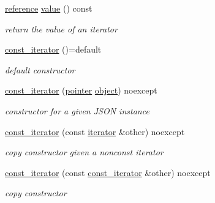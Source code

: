 \begin{DoxyCompactItemize}
\hyperlink{classnlohmann_1_1basic__json_1_1const__iterator_aefd248cac6493eed1e6ff53ba6a63eb2}{reference} \hyperlink{classnlohmann_1_1basic__json_1_1const__iterator_ac75e80d30b6169ee2a29ec93fb4d2acd}{value} () const 
\begin{DoxyCompactList}\small\item\em return the value of an iterator \end{DoxyCompactList}\item 
\hyperlink{classnlohmann_1_1basic__json_1_1const__iterator_ac6fdaff67857f82a623e5cc253917639}{const\-\_\-iterator} ()=default
\begin{DoxyCompactList}\small\item\em default constructor \end{DoxyCompactList}\item 
\hyperlink{classnlohmann_1_1basic__json_1_1const__iterator_a23de834b11bd895209aa65c100ab9ceb}{const\-\_\-iterator} (\hyperlink{classnlohmann_1_1basic__json_1_1const__iterator_a1da96fc3054d547e7706d3a2f073f389}{pointer} \hyperlink{classnlohmann_1_1basic__json_ad25b2f8c21e241e2d63455537a9294ff}{object}) noexcept
\begin{DoxyCompactList}\small\item\em constructor for a given J\-S\-O\-N instance \end{DoxyCompactList}\item 
\hyperlink{classnlohmann_1_1basic__json_1_1const__iterator_a6b950c6bc081ac1ec1540ec05ceb2603}{const\-\_\-iterator} (const \hyperlink{classnlohmann_1_1basic__json_1_1iterator}{iterator} \&other) noexcept
\begin{DoxyCompactList}\small\item\em copy constructor given a nonconst iterator \end{DoxyCompactList}\item 
\hyperlink{classnlohmann_1_1basic__json_1_1const__iterator_a18c35a6735d3da96b4fc026421c05dd8}{const\-\_\-iterator} (const \hyperlink{classnlohmann_1_1basic__json_1_1const__iterator}{const\-\_\-iterator} \&other) noexcept
\begin{DoxyCompactList}\small\item\em copy constructor \end{DoxyCompactList}\item 

\end{DoxyCompactItemize}
